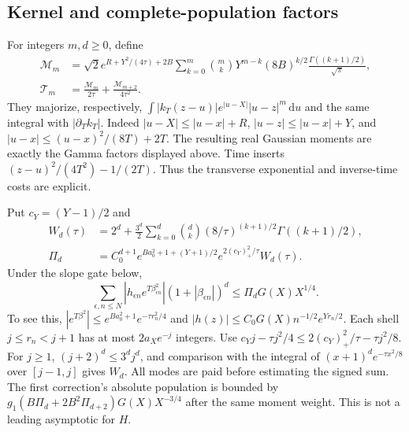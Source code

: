 \documentclass[11pt]{article}
\newcommand{\dd}{\,\mathrm d}
\numberwithin{equation}{section}
\begin{document}
\subsection{Kernel and complete-population factors}
For integers \(m,d\ge0\), define
\begin{align}
 \mathcal M_m&=\sqrt2e^{R+Y^2/(4\tau)+2B}
 \sum_{k=0}^m\binom mk Y^{m-k}(8B)^{k/2}
                  \frac{\Gamma((k+1)/2)}{\sqrt\pi},\\
 \mathcal T_m&=\frac{\mathcal M_m}{2\tau}
                     +\frac{\mathcal M_{m+2}}{4\tau^2}.
 \label{eq:compact-kernel-factors}
\end{align}
They majorize, respectively,
\(\int|k_T(z-u)|e^{|u-X|}|u-z|^m\dd u\) and the same integral
with \(|\partial_Tk_T|\). Indeed \(|u-X|\le|u-x|+R\),
\(|u-z|\le|u-x|+Y\), and
\(|u-x|\le (u-x)^2/(8T)+2T\). The resulting real Gaussian
moments are exactly the Gamma factors displayed above. Time inserts
\((z-u)^2/(4T^2)-1/(2T)\). Thus the transverse exponential and
inverse-time costs are explicit.

Put \(c_Y=(Y-1)/2\) and
\begin{align}
 W_d(\tau)&=2^d+\frac{3^d}{2}\sum_{k=0}^d\binom dk
          (8/\tau)^{(k+1)/2}\Gamma((k+1)/2),\\
 \Pi_d&=C_0^{d+1}e^{Ba_0^2+1+(Y+1)/2}
                 e^{2(c_Y)_+^2/\tau}W_d(\tau).
 \label{eq:compact-population-factors}
\end{align}
Under the slope gate below,
\begin{equation}
 \sum_{\epsilon,n\le N}|h_{\epsilon n}e^{T\beta_{\epsilon n}^2}|
       (1+|\beta_{\epsilon n}|)^d
       \le \Pi_dG(X)X^{1/4}.
 \label{eq:compact-population}
\end{equation}
To see this, \(|e^{T\beta^2}|\le e^{Ba_0^2+1}e^{-\tau r_n^2/4}\)
and \(|h(z)|\le C_0G(X)n^{-1/2}e^{Yr_n/2}\).
Each shell \(j\le r_n<j+1\) has at most \(2a_Xe^{-j}\)
integers. Use
\(c_Yj-\tau j^2/4\le2(c_Y)_+^2/\tau-\tau j^2/8\).
For \(j\ge1\), \((j+2)^d\le3^dj^d\), and comparison with the
integral of \((x+1)^de^{-\tau x^2/8}\) over \([j-1,j]\)
gives \(W_d\). All modes are paid before estimating the signed sum.
The first correction's absolute population is bounded by
\(g_1(B\Pi_d+2B^2\Pi_{d+2})G(X)X^{-3/4}\) after the same moment
weight. This is not a leading asymptotic for \(H\).
\end{document}
